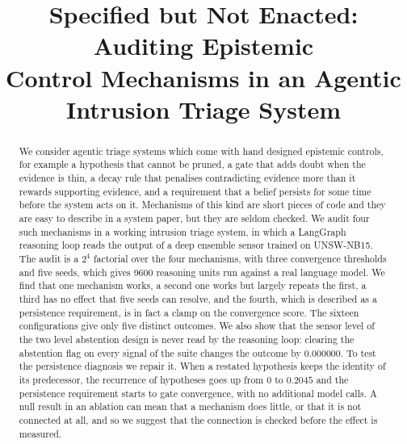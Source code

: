 \documentclass[conference]{IEEEtran}
\begin{document}
\title{Specified but Not Enacted: Auditing Epistemic\\Control Mechanisms in an Agentic\\Intrusion Triage System}

\author{
}

\maketitle

\begin{abstract}
We consider agentic triage systems which come with hand designed epistemic
controls, for example a hypothesis that cannot be pruned, a gate that adds
doubt when the evidence is thin, a decay rule that penalises contradicting
evidence more than it rewards supporting evidence, and a requirement that a
belief persists for some time before the system acts on it. Mechanisms of this
kind are short pieces of code and they are easy to describe in a system paper,
but they are seldom checked. We audit four such mechanisms in a working
intrusion triage system, in which a LangGraph reasoning loop reads the output
of a deep ensemble sensor trained on UNSW-NB15. The audit is a $2^4$ factorial
over the four mechanisms, with three convergence thresholds and five seeds,
which gives 9600 reasoning units run against a real language model. We find
that one mechanism works, a second one works but largely repeats the first, a
third has no effect that five seeds can resolve, and the fourth, which is
described as a persistence requirement, is in fact a clamp on the convergence
score. The sixteen configurations give only five distinct outcomes. We also
show that the sensor level of the two level abstention design is never read by
the reasoning loop: clearing the abstention flag on every signal of the suite
changes the outcome by $0.000000$. To test the persistence diagnosis we repair
it. When a restated hypothesis keeps the identity of its predecessor, the
recurrence of hypotheses goes up from $0$ to $0.2045$ and the persistence
requirement starts to gate convergence, with no additional model calls. A null
result in an ablation can mean that a mechanism does little, or that it is not
connected at all, and so we suggest that the connection is checked before the
effect is measured.
\end{abstract}
\end{document}
